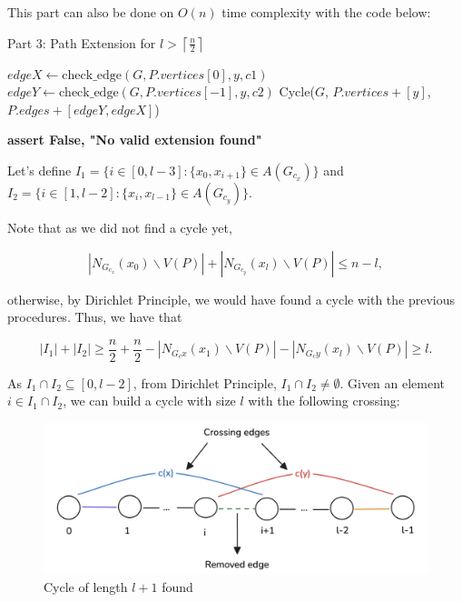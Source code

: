 This part can also be done on $O(n)$ time complexity with
the code below:

\begin{algorithm}[H]
    \caption{Part 3: Path Extension for \( l > \left \lceil \frac{n}{2} \right \rceil \)}
    \begin{algorithmic}
            \For{$[c1, c2] \in [[cx, cy], [cy, cx]]$} 
                        \State $edgeX \gets \text{check\_edge}(G, P.vertices[0], y, c1)$
                        \State $edgeY \gets \text{check\_edge}(G, P.vertices[-1], y, c2)$
                            \State \Return Cycle($G$, $P.vertices + [y]$, $P.edges + [edgeY, edgeX]$)
                        \EndIf
                    \EndIf
                \EndFor
            \EndFor

            \State \textbf{assert False, "No valid extension found"}
        \EndFunction
    \end{algorithmic}
\end{algorithm}

Let's define $I_1 = \{i \in [0, l - 3]: \{x_0, x_{i + 1}\} \in A(G_{c_x})\}$ and 
$I_2 = \{i \in [1, l - 2]: \{x_i, x_{l-1}\} \in A(G_{c_y})\}$.

Note that as we did not find a cycle yet, 

$$
|N_{G_{c_x}}(x_0) \backslash V(P)| + |N_{G_{c_y}}(x_l) \backslash V(P)| \leq n - l,
$$

otherwise, by Dirichlet Principle, we would have found a cycle
with the previous procedures. Thus, we have that

$$
|I_1| + |I_2| \geq \frac{n}{2} + \frac{n}{2} - |N_{G_cx}(x_1) \backslash V(P)| - |N_{G_cy}(x_l) \backslash V(P)| \geq l.
$$

As $I_1 \cap I_2 \subseteq [0, l - 2]$, from Dirichlet Principle, $I_1 \cap I_2 \neq \emptyset$. Given an element
$i \in I_1 \cap I_2$, we can build a cycle with size $l$ with
the following crossing:

\begin{figure}[H]
    \centering
    \includegraphics[width=1\textwidth]{figuras/path_cycle_crossing.png}
    \caption{Cycle of length \( l + 1 \) found}
    \label{fig:path_cycle_crossing}
\end{figure}

